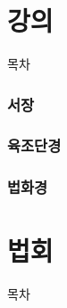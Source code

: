 \documentclass[aspectratio=1610,10pt,xcolor=pdftex,dvipsnames,table,handout]{beamer}
\begin{document}
			

		\part{강의}
		\frame{\partpage}
		
		\begin{frame} [plain]{목차}
		\tableofcontents%
		\end{frame}
		

%
	\section{서장 }
	\frame [plain] {\sectionpage}


%
	\section{육조단경 }
	\frame [plain] {\sectionpage}


%
	\section{법화경 }
	\frame [plain] {\sectionpage}

%
	\section{  }
	\frame [plain] {\sectionpage}



		\part{법회}
		\frame{\partpage}

		\begin{frame} [plain]{목차}
		\tableofcontents%
		\end{frame}
\end{document}
